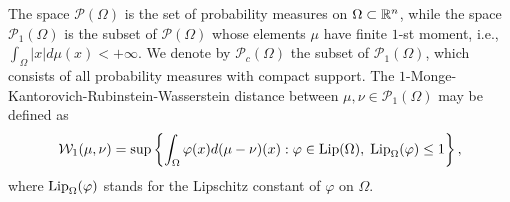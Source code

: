 {The space $\mathcal{P}(\Omega)$ is the set of probability measures on $\Omega \subset \mathbb{R}^n$, while the space %
$\mathcal{P}_1(\Omega)$ is the subset of $\mathcal{P}(\Omega)$ whose elements $\mu$ have finite $1$-st moment, i.e.,
$\int_{\Omega} |x| d\mu(x) < +\infty$.
We denote by $\mathcal{P}_c(\Omega)$ the subset of $\mathcal{P}_1(\Omega)$, which consists of all probability measures with compact support. %
%
The $1$-Monge-Kantorovich-Rubinstein-Wasserstein distance \cite{AGS,villani} between $\mu,\nu\in\mathcal{P}_1(\Omega)$ may be defined as
\begin{align}\label{dualwass}
\mathcal{W}_1(\mu,\nu)=\sup \left \{ \int_{\Omega} \varphi(x) d (\mu-\nu)(x)  : \varphi \in \textup{Lip}(\Omega), \; \textup{Lip}_{\Omega}(\varphi) \leq 1 \right \},
\end{align}
where $\textup{Lip}_{\Omega}(\varphi)$ stands for the Lipschitz constant of $\varphi$ on $\Omega$. 

}
